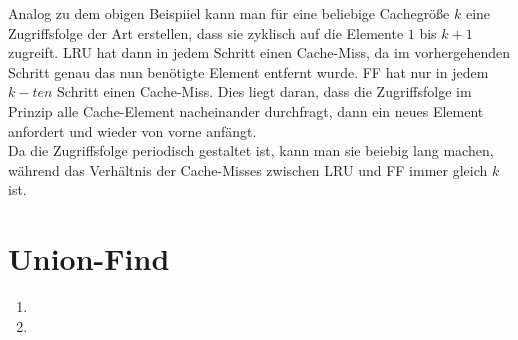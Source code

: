 \documentclass[a4paper,10pt]{article}
\begin{document}
\begin{enumerate}
Analog zu dem obigen Beispiiel kann man für eine beliebige Cachegröße $k$ eine Zugriffsfolge der Art erstellen, dass sie zyklisch auf die Elemente $1$ bis $k+1$ zugreift. LRU hat dann in jedem Schritt einen Cache-Miss, da im vorhergehenden Schritt genau das nun benötigte Element entfernt wurde. FF hat nur in jedem $k-ten$ Schritt einen Cache-Miss. Dies liegt daran, dass die Zugriffsfolge im Prinzip alle Cache-Element nacheinander durchfragt, dann ein neues Element anfordert und wieder von vorne anfängt.\\
Da die Zugriffsfolge periodisch gestaltet ist, kann man sie beiebig lang machen, während das Verhältnis der Cache-Misses zwischen LRU und FF immer gleich $k$ ist. 

\end{enumerate}

\section{Union-Find}
\begin{enumerate}
\item 
\item 
\end{enumerate}
\end{document}
